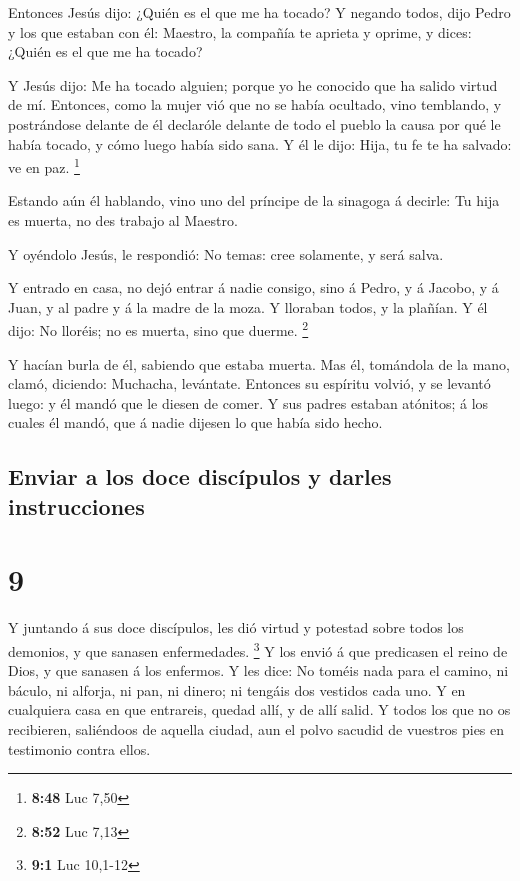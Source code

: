  Entonces Jesús dijo: ¿Quién es el que me ha tocado? Y
negando todos, dijo Pedro y los que estaban con él: Maestro, la compañía
te aprieta y oprime, y dices: ¿Quién es el que me ha tocado?

 Y Jesús dijo: Me ha tocado alguien; porque yo he
conocido que ha salido virtud de mí.  Entonces, como la
mujer vió que no se había ocultado, vino temblando, y postrándose
delante de él declaróle delante de todo el pueblo la causa por qué le
había tocado, y cómo luego había sido sana.  Y él le
dijo: Hija, tu fe te ha salvado: ve en paz. \footnote{\textbf{8:48} Luc
  7,50}

 Estando aún él hablando, vino uno del príncipe de la
sinagoga á decirle: Tu hija es muerta, no des trabajo al Maestro.

 Y oyéndolo Jesús, le respondió: No temas: cree
solamente, y será salva.

 Y entrado en casa, no dejó entrar á nadie consigo, sino
á Pedro, y á Jacobo, y á Juan, y al padre y á la madre de la moza.
 Y lloraban todos, y la plañían. Y él dijo: No lloréis;
no es muerta, sino que duerme. \footnote{\textbf{8:52} Luc 7,13}

 Y hacían burla de él, sabiendo que estaba muerta.
 Mas él, tomándola de la mano, clamó, diciendo: Muchacha,
levántate.  Entonces su espíritu volvió, y se levantó
luego: y él mandó que le diesen de comer.  Y sus padres
estaban atónitos; á los cuales él mandó, que á nadie dijesen lo que
había sido hecho.

\hypertarget{enviar-a-los-doce-discuxedpulos-y-darles-instrucciones}{%
\subsection{Enviar a los doce discípulos y darles
instrucciones}\label{enviar-a-los-doce-discuxedpulos-y-darles-instrucciones}}

\hypertarget{section-8}{%
\section{9}\label{section-8}}

 Y juntando á sus doce discípulos, les dió virtud y
potestad sobre todos los demonios, y que sanasen enfermedades.
\footnote{\textbf{9:1} Luc 10,1-12}  Y los envió á que
predicasen el reino de Dios, y que sanasen á los enfermos.
 Y les dice: No toméis nada para el camino, ni báculo, ni
alforja, ni pan, ni dinero; ni tengáis dos vestidos cada uno.
 Y en cualquiera casa en que entrareis, quedad allí, y de
allí salid.  Y todos los que no os recibieren, saliéndoos
de aquella ciudad, aun el polvo sacudid de vuestros pies en testimonio
contra ellos.

